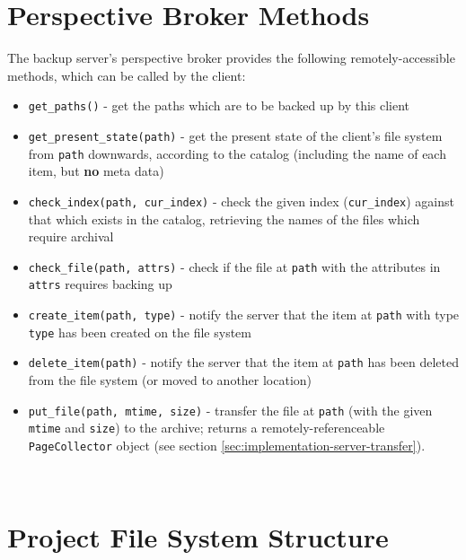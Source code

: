 \section{Perspective Broker Methods}
\label{sec:appendix-server-pb-methods}

The backup server's perspective broker provides the following
remotely-accessible methods, which can be called by the client:

\begin{itemize}
    \item \verb!get_paths()! - get the paths which are to be backed up by this
        client
    \item \verb!get_present_state(path)! - get the present state of the
        client's file system from \verb!path! downwards, according to the
        catalog (including the name of each item, but \textbf{no} meta data)
    \item \verb!check_index(path, cur_index)! - check the given index
        (\verb!cur_index!) against that which exists in the catalog, retrieving
        the names of the files which require archival
    \item \verb!check_file(path, attrs)! - check if the file at \verb!path!
        with the attributes in \verb!attrs! requires backing up
    \item \verb!create_item(path, type)! - notify the server that the item at
        \verb!path! with type \verb!type! has been created on the file system
    \item \verb!delete_item(path)! - notify the server that the item at
        \verb!path! has been deleted from the file system (or moved to another
        location)
    \item \verb!put_file(path, mtime, size)! - transfer the file at \verb!path!
        (with the given \verb!mtime! and \verb!size!) to the archive; returns
        a remotely-referenceable \verb!PageCollector! object (see section
        \ref{sec:implementation-server-transfer}).
\end{itemize}

\ \\[17cm]

\section{Project File System Structure}
\label{sec:appendix-structure}

